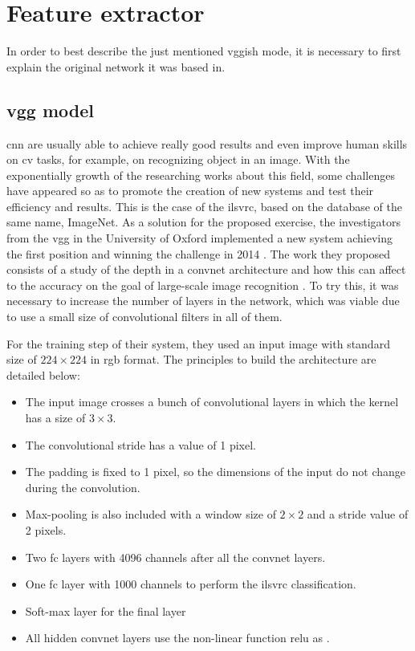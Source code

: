 \section{Feature extractor}
\label{section:feature-extractor}

	In order to best describe the just mentioned \acrshort{vgg}ish mode, it is necessary to first explain the  original network it was based in. 
	
\subsection{\acrfull{vgg} model}
\label{subsection:vgg}
	
	\acrfull{cnn} are usually able to achieve really good results and even improve human skills on \acrlong{cv} tasks, for example, on recognizing object in an image. With the exponentially growth of the researching works about this field, some challenges have appeared so as to promote the creation of new systems and test their efficiency and results. This is the case of the \acrfull{ilsvrc}, based on the database of the same name, ImageNet. As a solution for the proposed exercise, the investigators from the \acrfull{vgg} in the University of Oxford implemented a new system achieving the first position and winning the challenge in 2014 \cite{ImageNet2014}. The work they proposed consists of a study of the depth in a \acrlong{convnet} architecture and how this can affect to the accuracy on the goal of large-scale image recognition \cite{Simonyan2015}.  To try this, it was necessary to increase the number of layers in the network, which was viable due to use a small size of convolutional filters in all of them.
	
	For the training step of their system, they used an input image with standard size of $224 \times 224$ in \acrshort{rgb} format. The principles to build the architecture are detailed below:
	
	\begin{itemize}
		\item The input image crosses a bunch of convolutional layers in which the kernel has a size of $3 \times 3$.
		\item The convolutional stride has a value of 1 pixel.
		\item The padding is fixed to 1 pixel, so the dimensions of the input do not change during the convolution.
		\item Max-pooling is also included with a window size of $2 \times 2$ and a stride value of 2 pixels.
		\item Two \acrfull{fc} layers with 4096 channels after all the \acrlong{convnet} layers.
		\item One \acrshort{fc} layer with 1000 channels to perform the \acrshort{ilsvrc} classification.
		\item Soft-max layer for the final layer
		\item All hidden \acrlong{convnet} layers use the non-linear function \acrshort{relu} as .
	\end{itemize}

